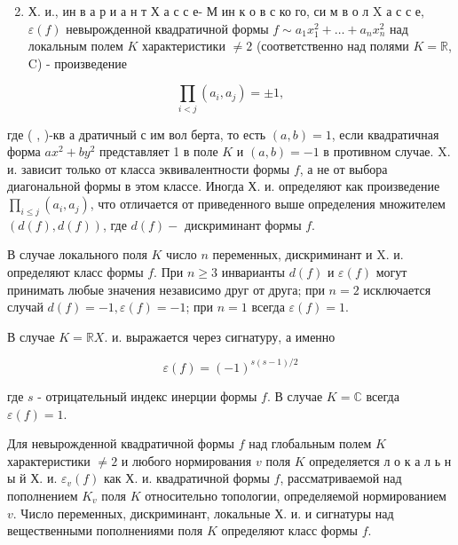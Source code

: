 \documentclass[10pt]{article}
\begin{document}
\begin{enumerate}

  \setcounter{enumi}{1}

  \item Х. и., ин в а р и а н т Х а с с е- М ин к о в с ко го, си м в о л $\mathrm{X}$ а с с е, $\varepsilon(f)$ невырожденной квадратичной формы $f \sim a_{1} x_{1}^{2}+\ldots+a_{n} x_{n}^{2}$ над локальным полем $K$ характеристики $\neq 2$ (соответственно над полями $K=\mathbb{R}$, C) - произведение

\end{enumerate}



\[

\prod_{i<j}\left(a_{i}, a_{j}\right)= \pm 1,

\]



где ( , )-кв а дратичный с им вол берта, то есть $(a, b)=1$, если квадратичная форма $a x^{2}+b y^{2}$ представляет 1 в поле $K$ и $(a, b)=-1$ в противном случае. X. и. зависит только от класса эквивалентности формы $f$, а не от выбора диагональной формы в этом классе. Иногда Х. и. определяют как произведение $\prod_{i \leqslant j}\left(a_{i}, a_{j}\right)$, что отличается от приведенного выше определения множителем $(d(f), d(f))$, где $d(f)-$ дискриминант формы $f$.



В случае локального поля $K$ число $n$ переменных, дискриминант и X. и. определяют класс формы $f$. При $n \geqslant 3$ инварианты $d(f)$ и $\varepsilon(f)$ могут принимать любые значения независимо друг от друга; при $n=2$ исключается случай $d(f)=-1, \varepsilon(f)=-1$; при $n=1$ всегда $\varepsilon(f)=1$.



В случае $K=\mathbb{R} X$. и. выражается через сигнатуру, а именно



\[

\varepsilon(f)=(-1)^{s(s-1) / 2}

\]



где $s$ - отрицательный индекс инерции формы $f$. В случае $K=\mathbb{C}$ всегда $\varepsilon(f)=1$.



Для невырожденной квадратичной формы $f$ над глобальным полем $K$ характеристики $\neq 2$ и любого нормирования $v$ поля $K$ определяется л о к а л ь н ы й Х. и. $\varepsilon_{v}(f)$ как Х. и. квадратичной формы $f$, рассматриваемой над пополнением $K_{v}$ поля $K$ относительно топологии, определяемой нормированием $v$. Число переменных, дискриминант, локальные Х. и. и сигнатуры над вещественными пополнениями поля $K$ определяют класс формы $f$.
\end{document}
